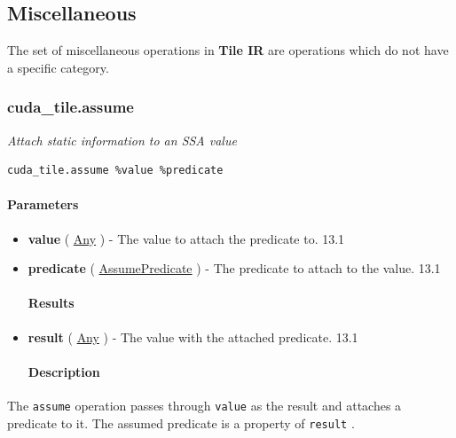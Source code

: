 \documentclass{article}
\begin{document}
\subsection{Miscellaneous}

The set of miscellaneous operations in \textbf{Tile IR} are operations which do not have a specific category.


\subsubsection{cuda\_tile.assume}

\textit{Attach static information to an SSA value}


\begin{lstlisting}
cuda_tile.assume %value %predicate
\end{lstlisting}

\paragraph{Parameters}

\begin{itemize}
\item \textbf{value} ( \href{https://docs.nvidia.com/cuda/tile-ir/latest/sections/operations.html#type-any}{Any} ) - The value to attach the predicate to. 13.1
\item \textbf{predicate} ( \href{https://docs.nvidia.com/cuda/tile-ir/latest/sections/operations.html#op-attribute-cuda-tile-assume-assumepredicate-attr}{AssumePredicate} ) - The predicate to attach to the value. 13.1


\paragraph{Results}

\item \textbf{result} ( \href{https://docs.nvidia.com/cuda/tile-ir/latest/sections/operations.html#type-any}{Any} ) - The value with the attached predicate. 13.1


\paragraph{Description}

\end{itemize}
The \texttt{assume} operation passes through \texttt{value} as the result and attaches a predicate to it. The assumed predicate is a property of \texttt{result} .
\end{document}
